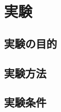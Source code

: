 \chapter{実験}
\label{chap:exeperiment}


\section{実験の目的}
\label{sec:purpose}


\section{実験方法}
\label{sec:method}


\section{実験条件}
\label{sec:condition}
